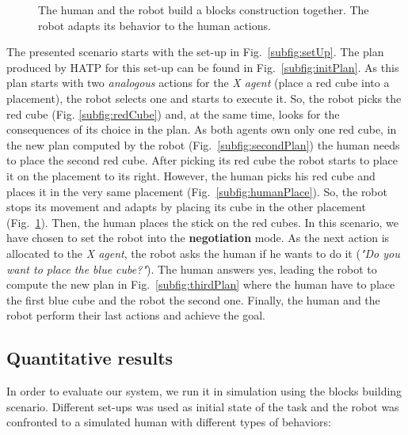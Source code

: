 \documentclass[english,a4paper,11pt,twoside]{StyleThese}
\begin{document}
\begin{figure}[!h]
{       \label{subfig:robotAdapts}
   }
    \caption{The human and the robot build a blocks construction together. The robot adapts its behavior to the human actions.}
\end{figure}


The presented scenario starts with the set-up in Fig.~\ref{subfig:setUp}. The plan produced by HATP for this set-up can be found in Fig.~\ref{subfig:initPlan}. As this plan starts with two \textit{analogous} actions for the \textit{X agent} (place a red cube into a placement), the robot selects one and starts to execute it. So, the robot picks the red cube (Fig. \ref{subfig:redCube}) and, at the same time, looks for the consequences of its choice in the plan. As both agents own only one red cube, in the new plan computed by the robot (Fig.~\ref{subfig:secondPlan}) the human needs to place the second red cube. After picking its red cube the robot starts to place it on the placement to its right. However, the human picks his red cube and places it in the very same placement (Fig.~\ref{subfig:humanPlace}). So, the robot stops its movement and adapts by placing its cube in the other placement (Fig.~\ref{subfig:robotAdapts}). Then, the human places the stick on the red cubes. In this scenario, we have chosen to set the robot into the \textbf{negotiation} mode. As the next action is allocated to the \textit{X agent}, the robot asks the human if he wants to do it (\textit{"Do you want to place the blue cube?"}). The human answers yes, leading the robot to compute the new plan in Fig.~\ref{subfig:thirdPlan} where the human have to place the first blue cube and the robot the second one. Finally, the human and the robot perform their last actions and achieve the goal.


\subsection{Quantitative results}

In order to evaluate our system, we run it in simulation using the blocks building scenario. Different set-ups was used as initial state of the task and the robot was confronted to a simulated human with different types of behaviors:
\end{document}
